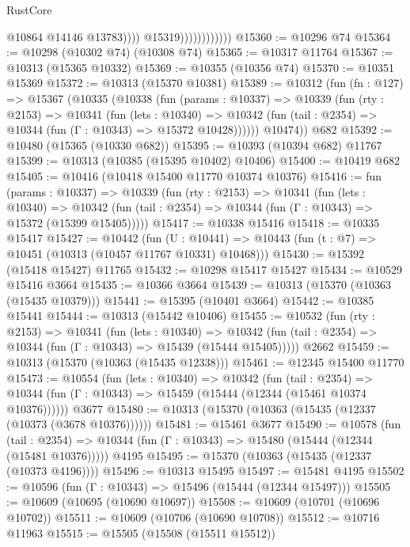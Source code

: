 \begin{lexlean}{RustCore}
\begin{coremodule}
                                    @10864
                                    @14146
                                    @13783))))
                            @15319))))))))))))
@15360 := @10296 @74
@15364 := @10298 (@10302 @74) (@10308 @74)
@15365 := @10317 @11764
@15367 := @10313 (@15365 @10332)
@15369 := @10355 (@10356 @74)
@15370 := @10351 @15369
@15372 := @10313 (@15370 @10381)
@15389 := @10312
    (fun (fn : @127) =>
    @15367
      (@10335
        (@10338
          (fun (params : @10337) =>
          @10339
            (fun (rty : @2153) =>
            @10341
              (fun (lets : @10340) =>
              @10342 (fun (tail : @2354) => @10344 (fun (Γ : @10343) => @15372 @10428))))))
        @10474))
    @682
@15392 := @10480 (@15365 (@10330 @682))
@15395 := @10393 (@10394 @682) @11767
@15399 := @10313 (@10385 (@15395 @10402) @10406)
@15400 := @10419 @682
@15405 := @10416 (@10418 @15400 @11770 @10374 @10376)
@15416 := fun (params : @10337) =>
  @10339
    (fun (rty : @2153) =>
    @10341
      (fun (lets : @10340) =>
      @10342 (fun (tail : @2354) => @10344 (fun (Γ : @10343) => @15372 (@15399 @15405)))))
@15417 := @10338 @15416
@15418 := @10335 @15417
@15427 := @10442
    (fun (U : @10441) => @10443 (fun (t : @7) => @10451 (@10313 (@10457 @11767 @10331) @10468)))
@15430 := @15392 (@15418 @15427) @11765
@15432 := @10298 @15417 @15427
@15434 := @10529 @15416 @3664
@15435 := @10366 @3664
@15439 := @10313 (@15370 (@10363 (@15435 @10379)))
@15441 := @15395 (@10401 @3664)
@15442 := @10385 @15441
@15444 := @10313 (@15442 @10406)
@15455 := @10532
    (fun (rty : @2153) =>
    @10341
      (fun (lets : @10340) =>
      @10342 (fun (tail : @2354) => @10344 (fun (Γ : @10343) => @15439 (@15444 @15405)))))
    @2662
@15459 := @10313 (@15370 (@10363 (@15435 @12338)))
@15461 := @12345 @15400 @11770
@15473 := @10554
    (fun (lets : @10340) =>
    @10342
      (fun (tail : @2354) =>
      @10344 (fun (Γ : @10343) => @15459 (@15444 (@12344 (@15461 @10374 @10376))))))
    @3677
@15480 := @10313 (@15370 (@10363 (@15435 (@12337 (@10373 (@3678 @10376))))))
@15481 := @15461 @3677
@15490 := @10578
    (fun (tail : @2354) => @10344 (fun (Γ : @10343) => @15480 (@15444 (@12344 (@15481 @10376)))))
    @4195
@15495 := @15370 (@10363 (@15435 (@12337 (@10373 @4196))))
@15496 := @10313 @15495
@15497 := @15481 @4195
@15502 := @10596 (fun (Γ : @10343) => @15496 (@15444 (@12344 @15497)))
@15505 := @10609 (@10695 (@10690 @10697))
@15508 := @10609 (@10701 (@10696 @10702))
@15511 := @10609 (@10706 (@10690 @10708))
@15512 := @10716 @11963
@15515 := @15505 (@15508 (@15511 @15512))

\end{coremodule}
\end{lexlean}
